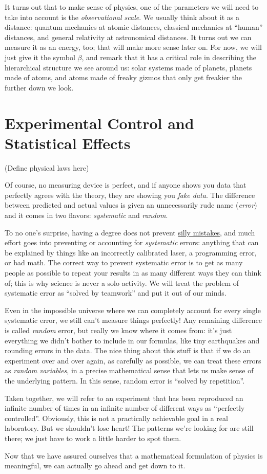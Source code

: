 It turns out that to make sense of physics, one of the parameters we will need to take into account is the \emph{observational scale}. We usually think about it as a distance: quantum mechanics at atomic distances, classical mechanics at ``human'' distances, and general relativity at astronomical distances. It turns out we can measure it as an energy, too; that will make more sense later on. For now, we will just give it the symbol $\beta$, and remark that it has a critical role in describing the hierarchical structure we see around us: solar systems made of planets, planets made of atoms, and atoms made of freaky gizmos that only get freakier the further down we look.

\section{Experimental Control and Statistical Effects}

(Define physical laws here)

Of course, no measuring device is perfect, and if anyone shows you data that perfectly agrees with the theory, they are showing you \emph{fake data}. The difference between predicted and actual values is given an unnecessarily rude name (\emph{error}) and it comes in two flavors: \emph{systematic} and \emph{random}.

To no one's surprise, having a degree does not prevent \href{https://en.wikipedia.org/wiki/Faster-than-light_neutrino_anomaly}{silly mistakes}, and much effort goes into preventing or accounting for \emph{systematic} errors: anything that can be explained by things like an incorrectly calibrated laser, a programming error, or bad math. The correct way to prevent systematic error is to get as many people as possible to repeat your results in as many different ways they can think of; this is why science is never a solo activity. We will treat the problem of systematic error as ``solved by teamwork'' and put it out of our minds.

Even in the impossible universe where we can completely account for every single systematic error, we still can't measure things perfectly! Any remaining difference is called \emph{random} error, but really we know where it comes from: it's just everything we didn't bother to include in our formulas, like tiny earthquakes and rounding errors in the data. The nice thing about this stuff is that if we do an experiment over and over again, as carefully as possible, we can treat these errors as \emph{random variables}, in a precise mathematical sense that lets us make sense of the underlying pattern. In this sense, random error is ``solved by repetition''.

Taken together, we will refer to an experiment that has been reproduced an infinite number of times in an infinite number of different ways as ``perfectly controlled''. Obviously, this is not a practically achievable goal in a real laboratory. But we shouldn't lose heart! The patterns we're looking for are still there; we just have to work a little harder to spot them.

Now that we have assured ourselves that a mathematical formulation of physics is meaningful, we can actually go ahead and get down to it.

